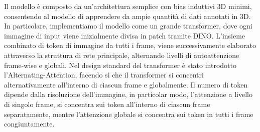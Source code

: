 Il modello è composto da un'architettura semplice con bias induttivi 3D minimi, consentendo al modello di apprendere da ampie quantità di dati annotati in 3D. In particolare, implementiamo il modello come un grande transformer, dove ogni immagine di input viene inizialmente divisa in patch tramite DINO. L'insieme combinato di token di immagine da tutti i frame, viene successivamente elaborato attraverso la struttura di rete principale, alternando livelli di autoattenzione frame-wise e globali. Nel design standard del transformer è stato introdotto l'Alternating-Attention, facendo sì che il transformer si concentri alternativamente all'interno di ciascun frame e globalmente. Il numero di token dipende dalla risoluzione dell'immagine, in particolar modo, l'attenzione a livello di singolo frame, si concentra sui token all'interno di ciascun frame separatamente, mentre l'attenzione globale si concentra sui token in tutti i frame congiuntamente. \cite{vggt}
